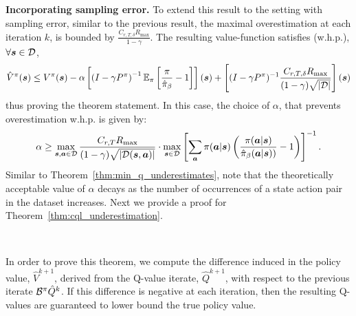 \textbf{Incorporating sampling error.} To extend this result to the setting with sampling error, similar to the previous result, the maximal overestimation at each iteration $k$, is bounded by $\frac{C_{r, T, \delta} R_{\max}}{1 - \gamma}$.
The resulting value-function satisfies (w.h.p.), $\forall \boldsymbol{s} \in \mathcal{D}$, 
\begin{equation*}
   \hat{V}^\pi(\boldsymbol{s}) \leq V^\pi(\boldsymbol{s}) - \alpha \left[\left(I - \gamma P^\pi \right)^{-1} \mathbb{E}_{\pi}\left[\frac{\pi}{\hat{\pi}_\beta} - 1 \right] \right](\boldsymbol{s}) + \left[ (I - \gamma P^\pi)^{-1} \frac{C_{r, T, \delta} R_{\max}}{(1- \gamma) \sqrt{|\mathcal{D}|}}\right](\boldsymbol{s})
\end{equation*}
thus proving the theorem statement. In this case, the choice of $\alpha$, that prevents overestimation w.h.p. is given by:
\begin{equation*}
    \alpha \geq \max_{\boldsymbol{s}, \boldsymbol{a} \in \mathcal{D}} \frac{C_{r, T} R_{\max}}{(1 - \gamma) \sqrt{|\mathcal{D}(\boldsymbol{s}, \boldsymbol{a})|}} \cdot \max_{\boldsymbol{s} \in \mathcal{D}} \left[\sum_{\boldsymbol{a}} \pi(\boldsymbol{a}|\boldsymbol{s}) \left(\frac{\pi(\boldsymbol{a}|\boldsymbol{s})}{\hat{\pi}_\beta(\boldsymbol{a}|\boldsymbol{s}))} - 1\right)\right]^{-1}.
\end{equation*}
Similar to Theorem~\ref{thm:min_q_underestimates}, note that the theoretically acceptable value of $\alpha$ decays as the number of occurrences of a state action pair in the dataset increases.
Next we provide a proof for Theorem~\ref{thm:cql_underestimation}.

~


In order to prove this theorem, we compute the difference induced in the policy value, $\hat{V}^{k+1}$, derived from the Q-value iterate, $\hat{Q}^{k+1}$, with respect to the previous iterate $\mathcal{B}^\pi \hat{Q}^{k}$. If this difference is negative at each iteration, then the resulting Q-values are guaranteed to lower bound the true policy value.

